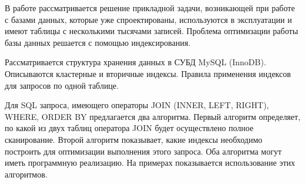 \Introduction

В работе рассматривается решение прикладной задачи, возникающей при работе с базами данных, которые уже спроектированы, используются в эксплуатации и имеют таблицы с несколькими тысячами записей. Проблема оптимизации работы базы данных решается с помощью индексирования. 

Рассматривается структура хранения данных в СУБД MySQL (InnoDB). Описываются кластерные и вторичные индексы. Правила применения индексов для запросов по одной таблице. 

Для SQL запроса, имеющего операторы JOIN (INNER, LEFT, RIGHT), WHERE, ORDER BY предлагается два алгоритма. Первый алгоритм определяет, по какой из двух таблиц оператора JOIN будет осуществлено полное сканирование. Второй алгоритм показывает, какие индексы необходимо построить для оптимизации выполнения этого запроса. Оба алгоритма могут иметь программную реализацию. На примерах показывается использование этих алгоритмов. 